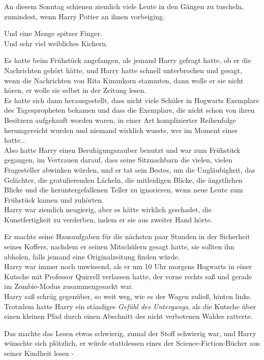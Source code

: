 {An diesem Sonntag schienen ziemlich viele Leute in den Gängen zu tuscheln, zumindest, wenn Harry Potter an ihnen vorbeiging.

Und eine Menge spitzer Finger.\\ Und sehr viel weibliches Kichern.

Es hatte beim Frühstück angefangen, als jemand Harry gefragt hatte, ob er die Nachrichten gehört hätte, und Harry hatte schnell unterbrochen und gesagt, wenn die Nachrichten von Rita Kimmkorn stammten, dann wolle er sie nicht hören, er wolle sie selbst in der Zeitung lesen.\\ Es hatte sich dann herausgestellt, dass nicht viele Schüler in Hogwarts Exemplare des Tagespropheten bekamen und dass die Exemplare, die nicht schon von ihren Besitzern aufgekauft worden waren, in einer Art komplizierter Reihenfolge herumgereicht wurden und niemand wirklich wusste, wer im Moment eines hatte...\\ Also hatte Harry einen Beruhigungszauber benutzt und war zum Frühstück gegangen, im Vertrauen darauf, dass seine Sitznachbarn die vielen, vielen Fragesteller abwinken würden, und er tat sein Bestes, um die Ungläubigkeit, das Gelächter, die gratulierenden Lächeln, die mitleidigen Blicke, die ängstlichen Blicke und die heruntergefallenen Teller zu ignorieren, wenn neue Leute zum Frühstück kamen und zuhörten.\\ Harry war ziemlich neugierig, aber es hätte wirklich geschadet, die Kunstfertigkeit zu verderben, indem er sie aus zweiter Hand hörte.

Er machte seine Hausaufgaben für die nächsten paar Stunden in der Sicherheit seines Koffers, nachdem er seinen Mitschülern gesagt hatte, sie sollten ihn abholen, falls jemand eine Originalzeitung finden würde.\\ Harry war immer noch unwissend, als er um 10 Uhr morgens Hogwarts in einer Kutsche mit Professor Quirrell verlassen hatte, der vorne rechts saß und gerade im Zombie-Modus zusammengesackt war.\\ Harry saß schräg gegenüber, so weit weg, wie es der Wagen zuließ, hinten links. Trotzdem hatte Harry ein ständiges \emph{Gefühl des Untergangs}, als die Kutsche über einen kleinen Pfad durch einen Abschnitt des nicht verbotenen Waldes ratterte.

Das machte das Lesen etwas schwierig, zumal der Stoff schwierig war, und Harry wünschte sich plötzlich, er würde stattdessen eines der Science-Fiction-Bücher aus seiner Kindheit lesen -

}
